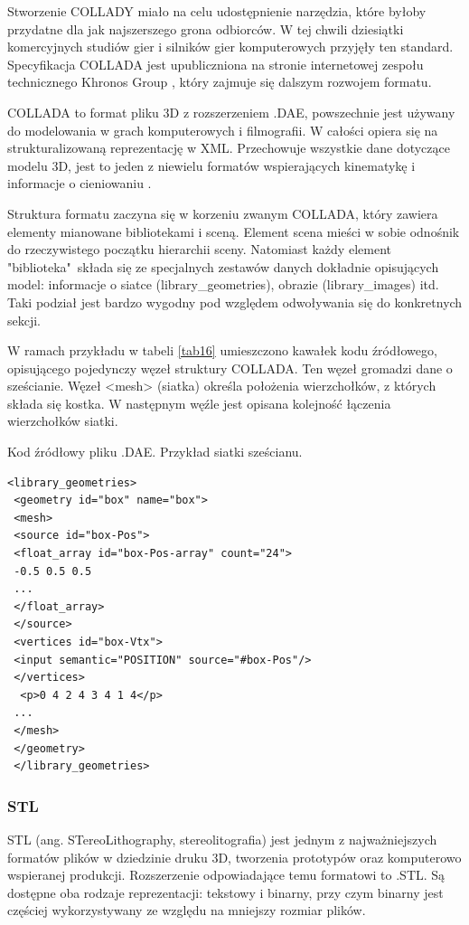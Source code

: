 Stworzenie COLLADY miało na celu udostępnienie narzędzia, które byłoby przydatne dla jak najszerszego grona odbiorców. W tej chwili dziesiątki komercyjnych studiów gier i silników gier komputerowych przyjęły ten standard. Specyfikacja COLLADA jest upubliczniona na stronie internetowej zespołu technicznego Khronos Group \cite{colladaInfo}, który zajmuje się dalszym rozwojem formatu.

COLLADA to format pliku 3D z rozszerzeniem .DAE, powszechnie jest używany do modelowania w grach komputerowych i filmografii. W całości opiera się na strukturalizowaną reprezentację w XML. Przechowuje wszystkie dane dotyczące modelu 3D, jest to jeden z niewielu formatów wspierających kinematykę i informacje o cieniowaniu \cite{colladaInfo}.

Struktura formatu zaczyna się w korzeniu zwanym COLLADA, który zawiera elementy mianowane bibliotekami i sceną. Element scena mieści w sobie odnośnik do rzeczywistego początku hierarchii sceny. Natomiast każdy element "biblioteka"\ składa się ze specjalnych zestawów danych dokładnie opisujących model: informacje o siatce (library\_geometries), obrazie (library\_images) itd. Taki podział jest bardzo wygodny pod względem odwoływania się do konkretnych sekcji.

W ramach przykładu w tabeli \ref{tab16} umieszczono kawałek kodu źródłowego, opisującego pojedynczy węzeł struktury COLLADA. Ten węzeł gromadzi dane o sześcianie. Węzeł <mesh> (siatka) określa położenia wierzchołków, z których składa się kostka. W następnym węźle jest opisana kolejność łączenia wierzchołków siatki.
\begin{table}[H]
\caption{Kod źródłowy pliku .DAE. Przykład siatki sześcianu.}
\label{tab16}
\begin{lstlisting}[frame=single]  % Start your code-block
 <library_geometries>
 <geometry id="box" name="box">
 <mesh>
 <source id="box-Pos">
 <float_array id="box-Pos-array" count="24">
 -0.5 0.5 0.5
 ...
 </float_array>
 </source>
 <vertices id="box-Vtx">
 <input semantic="POSITION" source="#box-Pos"/>
 </vertices>
  <p>0 4 2 4 3 4 1 4</p>
 ...
 </mesh>
 </geometry>
 </library_geometries>
\end{lstlisting}
\end{table}

\subsubsection{STL}
STL (ang. STereoLithography, stereolitografia) jest jednym z najważniejszych formatów plików w dziedzinie druku 3D, tworzenia prototypów oraz komputerowo wspieranej produkcji. Rozszerzenie odpowiadające temu formatowi to .STL. Są dostępne oba rodzaje reprezentacji: tekstowy i binarny, przy czym binarny jest częściej wykorzystywany ze względu na mniejszy rozmiar plików. 

